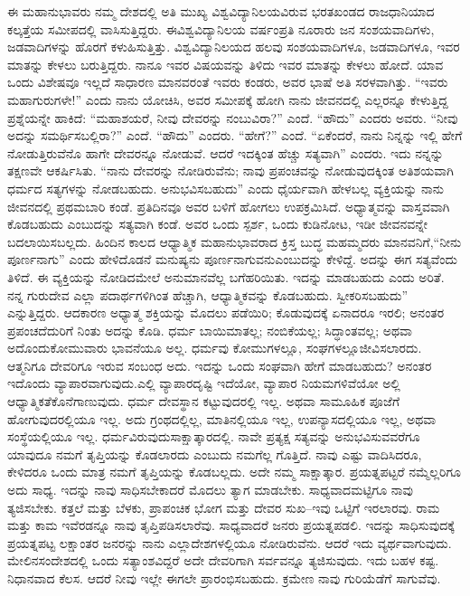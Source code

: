 ಈ ಮಹಾನುಭಾವರು ನಮ್ಮ ದೇಶದಲ್ಲಿ ಅತಿ ಮುಖ್ಯ ವಿಶ್ವವಿದ್ಯಾನಿಲಯವಿರುವ ಭರತಖಂಡದ ರಾಜಧಾನಿಯಾದ ಕಲ್ಕತ್ತೆಯ ಸಮೀಪದಲ್ಲಿ ವಾಸಿಸುತ್ತಿದ್ದರು. ಈ\break ವಿಶ್ವವಿದ್ಯಾನಿಲಯ ವರ್ಷಂಪ್ರತಿ ನೂರಾರು ಜನ ಸಂಶಯವಾದಿಗಳು, ಜಡವಾದಿಗಳನ್ನು ಹೊರಗೆ ಕಳುಹಿಸುತ್ತಿತ್ತು. ವಿಶ್ವವಿದ್ಯಾನಿಲಯದ ಹಲವು ಸಂಶಯವಾದಿಗಳೂ, ಜಡವಾದಿಗಳೂ, ಇವರ ಮಾತನ್ನು ಕೇಳಲು ಬರುತ್ತಿದ್ದರು. ನಾನೂ ಇವರ ವಿಷಯವನ್ನು ತಿಳಿದು ಇವರ ಮಾತನ್ನು ಕೇಳಲು ಹೋದೆ. ಯಾವ ಒಂದು ವಿಶೇಷವೂ ಇಲ್ಲದೆ ಸಾಧಾರಣ ಮಾನವರಂತೆ ಇವರು ಕಂಡರು, ಅವರ ಭಾಷೆ ಅತಿ ಸರಳವಾಗಿತ್ತು. “ಇವರು ಮಹಾಗುರುಗಳೇ!” ಎಂದು ನಾನು ಯೋಚಿಸಿ, ಅವರ ಸಮೀಪಕ್ಕೆ ಹೋಗಿ ನಾನು ಜೀವನದಲ್ಲಿ ಎಲ್ಲರನ್ನೂ ಕೇಳುತ್ತಿದ್ದ ಪ್ರಶ್ನೆಯನ್ನೇ ಹಾಕಿದೆ: “ಮಹಾಶಯರೆ, ನೀವು ದೇವರನ್ನು ನಂಬುವಿರಾ?” ಎಂದೆ. “ಹೌದು” ಎಂದರು ಅವರು. “ನೀವು ಅದನ್ನು ಸಮರ್ಥಿಸಬಲ್ಲಿರಾ?” ಎಂದೆ. “ಹೌದು” ಎಂದರು. “ಹೇಗೆ?” ಎಂದೆ. “ಏಕೆಂದರೆ, ನಾನು ನಿನ್ನನ್ನು ಇಲ್ಲಿ ಹೇಗೆ ನೋಡುತ್ತಿರುವೆನೊ ಹಾಗೇ ದೇವರನ್ನೂ ನೋಡುವೆ. ಆದರೆ ಇದಕ್ಕಿಂತ ಹೆಚ್ಚು ಸತ್ಯವಾಗಿ” ಎಂದರು. ಇದು ನನ್ನನ್ನು ತಕ್ಷಣವೇ ಆಕರ್ಷಿಸಿತು. “ನಾನು ದೇವರನ್ನು ನೋಡಿರುವೆನು; ನಾವು ಪ್ರಪಂಚವನ್ನು ನೋಡುವುದಕ್ಕಿಂತ ಅತಿಶಯವಾಗಿ ಧರ್ಮದ ಸತ್ಯಗಳನ್ನು ನೋಡಬಹುದು. ಅನುಭವಿಸಬಹುದು” ಎಂದು ಧೈರ್ಯವಾಗಿ ಹೇಳಬಲ್ಲ ವ್ಯಕ್ತಿಯನ್ನು ನಾನು ಜೀವನದಲ್ಲಿ ಪ್ರಥಮಬಾರಿ ಕಂಡೆ. ಪ್ರತಿದಿನವೂ ಅವರ ಬಳಿಗೆ ಹೋಗಲು ಉಪಕ್ರಮಿಸಿದೆ. ಅಧ್ಯಾತ್ಮವನ್ನು ವಾಸ್ತವವಾಗಿ ಕೊಡಬಹುದು ಎಂಬುದನ್ನು ಸತ್ಯವಾಗಿ ಕಂಡೆ. ಅವರ ಒಂದು ಸ್ಪರ್ಶ, ಒಂದು ಕುಡಿನೋಟ, ಇಡೀ ಜೀವನವನ್ನೇ ಬದಲಾಯಿಸಬಲ್ಲದು. ಹಿಂದಿನ ಕಾಲದ ಆಧ್ಯಾತ್ಮಿಕ ಮಹಾನುಭಾವರಾದ ಕ್ರಿಸ್ತ ಬುದ್ಧ ಮಹಮ್ಮದರು ಮಾನವನಿಗೆ,\break “ನೀನು ಪೂರ್ಣನಾಗು” ಎಂದು ಹೇಳಿದೊಡನೆ ಮನುಷ್ಯನು ಪೂರ್ಣನಾಗುವನು\break ಎಂಬುದನ್ನು ಕೇಳಿದ್ದೆ. ಅದನ್ನು ಈಗ ಸತ್ಯವೆಂದು ತಿಳಿದೆ. ಈ ವ್ಯಕ್ತಿಯನ್ನು ನೋಡಿದ\break ಮೇಲೆ ಅನುಮಾನವೆಲ್ಲ ಬಗೆಹರಿಯಿತು. ಇದನ್ನು ಮಾಡಬಹುದು ಎಂದು ಅರಿತೆ. ನನ್ನ ಗುರುದೇವ ಎಲ್ಲಾ ಪದಾರ್ಥಗಳಿಗಿಂತ ಹೆಚ್ಚಾಗಿ, ಆಧ್ಯಾತ್ಮಿಕವನ್ನು ಕೊಡಬಹುದು. ಸ್ವೀಕರಿಸಬಹುದು” ಎನ್ನುತ್ತಿದ್ದರು. ಆದಕಾರಣ ಅಧ್ಯಾತ್ಮ ಶಕ್ತಿಯನ್ನು ಮೊದಲು ಪಡೆಯಿರಿ; ಕೊಡುವುದಕ್ಕೆ ಏನಾದರೂ ಇರಲಿ; ಅನಂತರ ಪ್ರಪಂಚದೆದುರಿಗೆ ನಿಂತು ಅದನ್ನು ಕೊಡಿ. ಧರ್ಮ ಬಾಯಿಮಾತಲ್ಲ; ನಂಬಿಕೆಯಲ್ಲ; ಸಿದ್ಧಾಂತವಲ್ಲ; ಅಥವಾ ಅದೊಂದು\break ಕೋಮುವಾರು ಭಾವನೆಯೂ ಅಲ್ಲ. ಧರ್ಮವು ಕೋಮುಗಳಲ್ಲೂ, ಸಂಘಗಳಲ್ಲೂ\break ಜೀವಿಸಲಾರದು. ಆತ್ಮನಿಗೂ ದೇವರಿಗೂ ಇರುವ ಸಂಬಂಧ ಅದು. ಇದನ್ನು ಒಂದು ಸಂಘವಾಗಿ ಹೇಗೆ ಮಾಡಬಹುದು? ಅನಂತರ ಇದೊಂದು ವ್ಯಾಪಾರವಾಗುವುದು.\break ಎಲ್ಲಿ ವ್ಯಾಪಾರದೃಷ್ಟಿ ಇದೆಯೋ, ವ್ಯಾಪಾರ ನಿಯಮಗಳಿವೆಯೋ ಅಲ್ಲಿ ಆಧ್ಯಾತ್ಮಿಕತೆ\break ಕೊನೆಗಾಣುವುದು. ಧರ್ಮ ದೇವಸ್ಥಾನ ಕಟ್ಟುವುದರಲ್ಲಿ ಇಲ್ಲ. ಅಥವಾ ಸಾಮೂಹಿಕ ಪೂಜೆಗೆ ಹೋಗುವುದರಲ್ಲಿಯೂ ಇಲ್ಲ. ಅದು ಗ್ರಂಥದಲ್ಲಿಲ್ಲ, ಮಾತಿನಲ್ಲಿಯೂ ಇಲ್ಲ, ಉಪನ್ಯಾಸದಲ್ಲಿಯೂ ಇಲ್ಲ, ಅಥವಾ ಸಂಸ್ಥೆಯಲ್ಲಿಯೂ ಇಲ್ಲ. ಧರ್ಮವಿರುವುದು\break ಸಾಕ್ಷಾತ್ಕಾರದಲ್ಲಿ. ನಾವೇ ಪ್ರತ್ಯಕ್ಷ ಸತ್ಯವನ್ನು ಅನುಭವಿಸುವವರೆಗೂ ಯಾವುದೂ ನಮಗೆ ತೃಪ್ತಿಯನ್ನು ಕೊಡಲಾರದು ಎಂಬುದು ನಮಗೆಲ್ಲ ಗೊತ್ತಿದೆ. ನಾವು ಎಷ್ಟು ವಾದಿಸಿದರೂ, ಕೇಳಿದರೂ ಒಂದು ಮಾತ್ರ ನಮಗೆ ತೃಪ್ತಿಯನ್ನು ಕೊಡಬಲ್ಲದು. ಅದೇ ನಮ್ಮ ಸಾಕ್ಷಾತ್ಕಾರ. ಪ್ರಯತ್ನಪಟ್ಟರೆ ನಮ್ಮೆಲ್ಲರಿಗೂ ಅದು ಸಾಧ್ಯ. ಇದನ್ನು ನಾವು ಸಾಧಿಸಬೇಕಾದರೆ ಮೊದಲು ತ್ಯಾಗ ಮಾಡಬೇಕು. ಸಾಧ್ಯವಾದಮಟ್ಟಿಗೂ ನಾವು ತ್ಯಜಿಸಬೇಕು. ಕತ್ತಲೆ ಮತ್ತು ಬೆಳಕು, ಪ್ರಾಪಂಚಿಕ ಭೋಗ ಮತ್ತು ದೇವರ ಸುಖ–ಇವು ಒಟ್ಟಿಗೆ ಇರಲಾರವು. ರಾಮ ಮತ್ತು ಕಾಮ ಇವೆರಡನ್ನೂ ನಾವು ತೃಪ್ತಿಪಡಿಸಲಾರೆವು. ಸಾಧ್ಯವಾದರೆ ಜನರು ಪ್ರಯತ್ನಪಡಲಿ. ಇದನ್ನು ಸಾಧಿಸುವುದಕ್ಕೆ ಪ್ರಯತ್ನಪಟ್ಟ ಲಕ್ಷಾಂತರ ಜನರನ್ನು ನಾನು ಎಲ್ಲಾ\break ದೇಶಗಳಲ್ಲಿಯೂ ನೋಡಿರುವೆನು. ಆದರೆ ಇದು ವ್ಯರ್ಥವಾಗುವುದು. ಮೇಲಿನ\break ಸಂದೇಶದಲ್ಲಿ ಒಂದು ಸತ್ಯಾಂಶವಿದ್ದರೆ ಅದೇ ದೇವರಿಗಾಗಿ ಸರ್ವವನ್ನೂ ತ್ಯಜಿಸುವುದು. ಇದು ಬಹಳ ಕಷ್ಟ. ನಿಧಾನವಾದ ಕೆಲಸ. ಆದರೆ ನೀವು ಇಲ್ಲೇ ಈಗಲೇ ಪ್ರಾರಂಭಿಸಬಹುದು. ಕ್ರಮೇಣ ನಾವು ಗುರಿಯೆಡೆಗೆ ಸಾಗುವೆವು.

